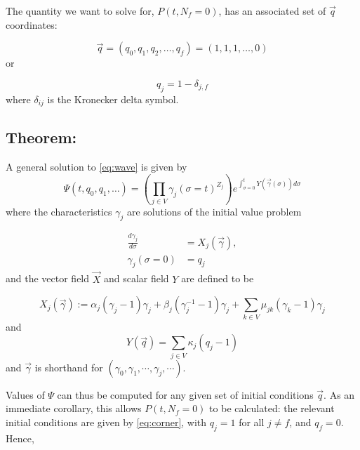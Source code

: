 \documentclass{article}
\begin{document}
The quantity we want to solve for, $P(t,N_f = 0)$, has an associated set of
$\vec{q}$ coordinates:

\begin{equation}
    \vec{q} = (q_0,q_1,q_2,\dots,q_f) = (1,1,1,\dots,0)
\end{equation}
or

\begin{equation}
    q_j = 1 - \delta_{j,f}
\end{equation}
where $\delta_{ij}$ is the Kronecker delta symbol.

\subsection*{Theorem:}


A general solution to \eqref{eq:wave} is given by
\begin{equation}
    \Psi(t,q_0,q_1,\dots) = \left(\prod_{j \in V}
    \gamma_j(\sigma=t)^{Z_j}\right)
    e^{\int_{\sigma=0}^t Y(\vec{\gamma}(\sigma)) d\sigma}
    \label{eq:formalsln}
\end{equation}
where the characteristics ${\gamma}_j$ are solutions of the initial value problem

\begin{align}
    \frac{d {\gamma}_j}{d \sigma} &= {X}_j(\vec{\gamma}),
    \nonumber \\
    {\gamma}_j(\sigma = 0) &= {q}_j
    \label{eq:ivp}
\end{align}
and the vector field $\vec{X}$ and scalar field $Y$ are defined to be

\begin{equation*}
    X_j(\vec{\gamma}) :=
    \alpha_j (\gamma_j - 1) \gamma_j
    + \beta_j (\gamma_j^{-1} - 1) \gamma_j
    + \sum_{k \in V} \mu_{jk} (\gamma_k - 1) \gamma_j
\end{equation*}
and
\begin{equation*}
    Y(\vec{q}) = \sum_{j \in V}\kappa_j (q_j - 1)
\end{equation*}
and $\vec{\gamma}$ is shorthand for $(\gamma_0, \gamma_1, \cdots, \gamma_j,
\cdots)$.

Values of $\Psi$ can thus be computed for any given set of initial conditions
$\vec{q}$. As an immediate corollary, this allows $P(t,N_f = 0)$ to be calculated:
the relevant initial conditions are given by \eqref{eq:corner}, with $q_j = 1$
for all $j\neq f$, and $q_f = 0$. Hence,
\end{document}
